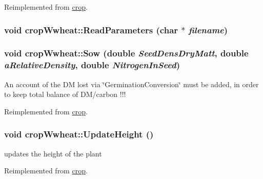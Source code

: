Reimplemented from \hyperlink{classcrop_a387dc393ee7cd05a40874739cff8579e}{crop}.\hypertarget{classcrop_wwheat_ae2a9c67716b7722a45b86e83d41ca26f}{
\subsubsection[{ReadParameters}]{\setlength{\rightskip}{0pt plus 5cm}void cropWwheat::ReadParameters (char $\ast$ {\em filename})}}
\label{classcrop_wwheat_ae2a9c67716b7722a45b86e83d41ca26f}
\hypertarget{classcrop_wwheat_a48bc90182781fdf230087c37b372238d}{
\subsubsection[{Sow}]{\setlength{\rightskip}{0pt plus 5cm}void cropWwheat::Sow (double {\em SeedDensDryMatt}, \/  double {\em aRelativeDensity}, \/  double {\em NitrogenInSeed})}}
\label{classcrop_wwheat_a48bc90182781fdf230087c37b372238d}
An account of the DM lost via \char`\"{}GerminationConversion\char`\"{} must be added, in order to keep total balance of DM/carbon !!! 

Reimplemented from \hyperlink{classcrop_a2c5df235a96a1daa3ab122baf17518d4}{crop}.\hypertarget{classcrop_wwheat_a42da6f7e2539c75a2171f2dae571257f}{
\subsubsection[{UpdateHeight}]{\setlength{\rightskip}{0pt plus 5cm}void cropWwheat::UpdateHeight ()}}
\label{classcrop_wwheat_a42da6f7e2539c75a2171f2dae571257f}
updates the height of the plant 

Reimplemented from \hyperlink{classcrop_aeccf3077c6ad647769145b8064ba426b}{crop}.

